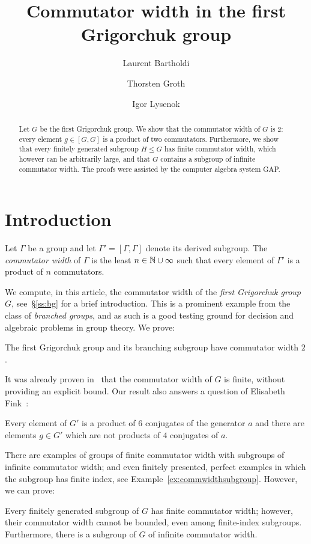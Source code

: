 \documentclass[a4paper,11pt]{amsart}
\begin{document}
\title{Commutator width in the first Grigorchuk group}
\author{Laurent Bartholdi}
\author{Thorsten Groth}
\author{Igor Lysenok}
\begin{abstract}
  Let $G$ be the first Grigorchuk group.  We show that the commutator
  width of $G$ is $2$: every element $g\in [G,G]$ is a product of two
  commutators. Furthermore, we show that every finitely generated
  subgroup $H\leq G$ has finite commutator width, which however can be
  arbitrarily large, and that $G$ contains a subgroup of infinite
  commutator width. The proofs were assisted by the computer algebra
  system GAP.
\end{abstract}
\maketitle

\section{Introduction}
Let $\Gamma$ be a group and let $\Gamma'=[\Gamma,\Gamma]$ denote its
derived subgroup. The \emph{commutator width} of $\Gamma$ is the least
$n\in \mathbb{N}\cup \infty$ such that every element of $\Gamma'$ is a
product of $n$ commutators.

We compute, in this article, the commutator width of the \emph{first
  Grigorchuk group} $G$, see~\S\ref{ss:bg} for a brief
introduction. This is a prominent example from the class of
\emph{branched groups}, and as such is a good testing ground for
decision and algebraic problems in group theory. We prove:
\begin{thma}\label{thm:CWGrigorchukGroup}
  The first Grigorchuk group and its branching subgroup have
  commutator width $2$.
\end{thma}
It was already proven in~\cite{Lysenok-Miasnikov-Ushakov:QuadraticEquationsInGrig} that
the commutator width of $G$ is finite, 
without providing an explicit bound.
Our result also
answers a question of Elisabeth
Fink~\cite[Question~3]{Fink:Conjugacy_growth}:
\begin{cora}\label{cor:productOf6Conjugates}
  Every element of $G'$ is a product of $6$ conjugates of the
  generator $a$ and there are elements $g\in G'$ which are 
  not products of $4$ conjugates of $a$.
\end{cora}


There are examples of groups of finite commutator width with subgroups
of infinite commutator width; and even finitely presented, perfect
examples in which the subgroup has finite index, see
Example~\ref{ex:commwidthsubgroup}. However, we can prove:
\begin{thma}\label{thm:subgroups}
  Every finitely generated subgroup of $G$ has finite commutator
  width; however, their commutator width cannot be bounded, even among
  finite-index subgroups. Furthermore, there is a subgroup of $G$ of infinite commutator width.
\end{thma}
\end{document}

